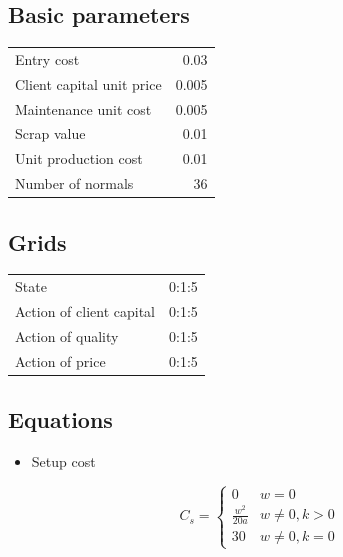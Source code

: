 \documentclass[11pt]{article}
\begin{document}
\subsection{Basic parameters}
\label{sec-2-1}
\begin{center}
\begin{tabular}{|l|r|}
\hline
Entry cost & 0.03\\
Client capital unit price & 0.005\\
Maintenance unit cost & 0.005\\
Scrap value & 0.01\\
Unit production cost & 0.01\\
Number of normals & 36\\
\hline
\end{tabular}
\end{center}

\subsection{Grids}
\label{sec-2-2}
\begin{center}
\begin{tabular}{|l|r|}
\hline
State & 0:1:5\\
Action of client capital & 0:1:5\\
Action of quality & 0:1:5\\
Action of price & 0:1:5\\
\hline
\end{tabular}
\end{center}

\subsection{Equations}
\label{sec-2-3}
\begin{itemize}
\item Setup cost
\end{itemize}
\[ C_{s}=\begin{cases} 0 & w=0 \\ \frac{w^2}{20a} & w\ne0, k > 0 \\ 30 & w\ne0, k=0 \end{cases}\]
\end{document}
